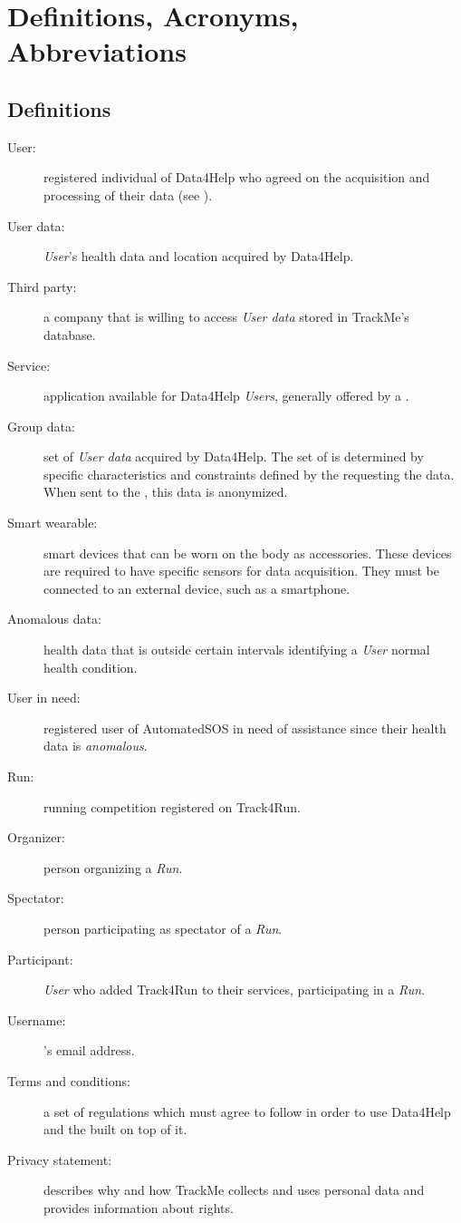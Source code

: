 \documentclass[../../rasd.tex]{subfiles}
\begin{document}
\section{Definitions, Acronyms, Abbreviations}
		\subsection{Definitions}
		\begin{description}
			\item[User:]registered individual of Data4Help who agreed on the acquisition and processing of their data (see ).
			\item[User data:]\textit{User}'s health data and location acquired by Data4Help.
			\item[Third party:]a company that is willing to access \textit{User data} stored in TrackMe's database.
			\item[Service:]application available for Data4Help \textit{Users}, generally offered by a .
			\item[Group data:]set of \textit{User data} acquired by Data4Help. The set of  is determined by specific characteristics and constraints defined by the  requesting the data. When sent to the , this data is anonymized.
			\item[Smart wearable:]smart devices that can be worn on the body as accessories. These devices are required to have specific sensors for data acquisition. They must be connected to an external device, such as a smartphone.
			\item[Anomalous data:]health data that is outside certain intervals identifying a \textit{User} normal health condition.
			\item[User in need:]registered user of AutomatedSOS in need of assistance since their health data is \textit{anomalous}.
			\item[Run:]running competition registered on Track4Run. 
			\item[Organizer:]person organizing a \textit{Run}.
			\item[Spectator:]person participating as spectator of a \textit{Run}.
			\item[Participant:]\textit{User} who added Track4Run to their services, participating in a \textit{Run}.
			\item[Username:]'s email address.
			\item[Terms and conditions:]a set of regulations which  must agree to follow in order to use Data4Help and the  built on top of it.
			\item[Privacy statement:]describes why and how TrackMe collects and uses personal data and provides information about  rights.
			
			


		\end{description}
\end{document}
